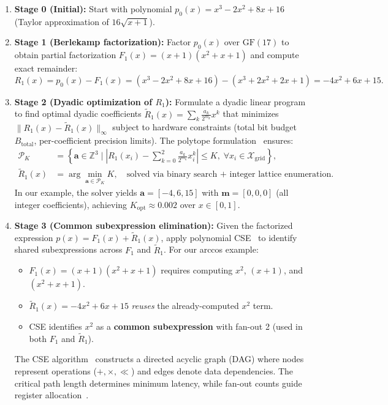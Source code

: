 \begin{enumerate}
    \item \textbf{Stage 0 (Initial):} Start with polynomial $p_0(x) = x^3 - 2x^2 + 8x + 16$ (Taylor approximation of $16\sqrt{x+1}$).
    
    \item \textbf{Stage 1 (Berlekamp factorization):} Factor $p_0(x)$ over $\mathrm{GF}(17)$ to obtain partial factorization $F_1(x) = (x+1)(x^2+x+1)$ and compute exact remainder:
    \[
    R_1(x) = p_0(x) - F_1(x) = (x^3 - 2x^2 + 8x + 16) - (x^3 + 2x^2 + 2x + 1) = -4x^2 + 6x + 15.
    \]
    
    \item \textbf{Stage 2 (Dyadic optimization of $R_1$):} Formulate a dyadic linear program to find optimal dyadic coefficients $\tilde{R}_1(x) = \sum_{k} \frac{a_k}{2^{m_k}} x^k$ that minimizes $\|R_1(x) - \tilde{R}_1(x)\|_\infty$ subject to hardware constraints (total bit budget $B_{\text{total}}$, per-coefficient precision limits). The polytope formulation~\cite{Abdi2024} ensures:
    \begin{align}
    \mathcal{P}_K &= \left\{ \mathbf{a} \in \mathbb{Z}^3 \mid \left|R_1(x_i) - \sum_{k=0}^2 \frac{a_k}{2^{m_k}} x_i^k\right| \leq K, \; \forall x_i \in \mathcal{X}_{\text{grid}} \right\}, \label{eq:dyadic_polytope}\\
    \tilde{R}_1(x) &= \arg\min_{\mathbf{a} \in \mathcal{P}_K} K, \quad \text{solved via binary search + integer lattice enumeration}. \nonumber
    \end{align}
    In our example, the solver yields $\mathbf{a} = [-4, 6, 15]$ with $\mathbf{m} = [0, 0, 0]$ (all integer coefficients), achieving $K_{\text{opt}} \approx 0.002$ over $x \in [0, 1]$.
    
    \item \textbf{Stage 3 (Common subexpression elimination):} Given the factorized expression $p(x) = F_1(x) + \tilde{R}_1(x)$, apply polynomial CSE~\cite{Mehdizadeh2004,Gustafsson2007} to identify shared subexpressions across $F_1$ and $\tilde{R}_1$. For our arccos example:
    \begin{itemize}
        \item $F_1(x) = (x+1)(x^2+x+1)$ requires computing $x^2$, $(x+1)$, and $(x^2+x+1)$.
        \item $\tilde{R}_1(x) = -4x^2 + 6x + 15$ \emph{reuses} the already-computed $x^2$ term.
        \item CSE identifies $x^2$ as a \textbf{common subexpression} with fan-out 2 (used in both $F_1$ and $\tilde{R}_1$).
    \end{itemize}
    The CSE algorithm~\cite{Mehdizadeh2004} constructs a directed acyclic graph (DAG) where nodes represent operations ($+, \times, \ll$) and edges denote data dependencies. The critical path length determines minimum latency, while fan-out counts guide register allocation~\cite{Gustafsson2007}.
    

\end{enumerate}
